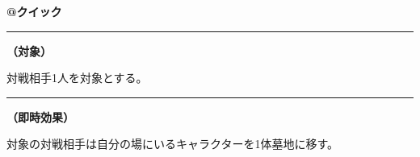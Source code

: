 \documentclass[twocolumn,a5paper,papersize,10pt]{jarticle}
\begin{document}
\vspace{-1zh}
\begin{tcolorbox}[title={\small\bf【Action】薙払}{\scriptsize （兵士起因）}]

{\scriptsize\bf @クイック }

\vspace{1mm} %
\hrule height 0.1mm depth 0mm width 62mm %
\vspace{1mm} %

{\bf（対象）}

対戦相手1人を対象とする。

\vspace{1mm} %
\hrule height 0.1mm depth 0mm width 62mm %
\vspace{1mm} %

{\bf（即時効果）}

対象の対戦相手は自分の場にいるキャラクターを1体墓地に移す。

\vspace{1mm} %
\end{tcolorbox}

\vspace{-1zh}
  
\end{document}
